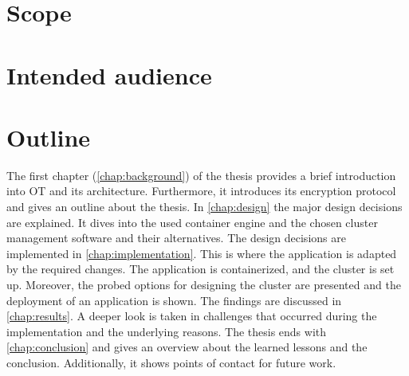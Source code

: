 
\section{Scope}
\section{Intended audience}


\section{Outline}
The first chapter (\autoref{chap:background}) of the thesis provides a brief introduction into \ac{OT} and its architecture. Furthermore, it introduces its encryption protocol and gives an outline about the thesis. In \autoref{chap:design} the major design decisions are explained. It dives into the used container engine and the chosen cluster management software and their alternatives.
The design decisions are implemented in \autoref{chap:implementation}. This is where the application is adapted by the required changes. The application is containerized, and the cluster is set up. Moreover, the probed options for designing the cluster are presented and the deployment of an application is shown.
The findings are discussed in \autoref{chap:results}. A deeper look is taken in challenges that occurred during the implementation and the underlying reasons.
The thesis ends with \autoref{chap:conclusion} and gives an overview about the learned lessons and the conclusion. Additionally, it shows points of contact for future work.
